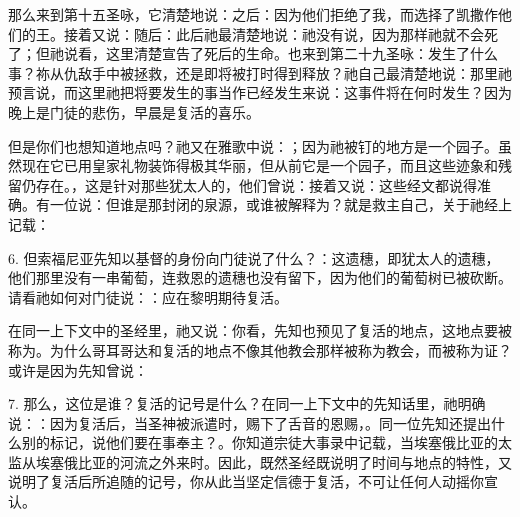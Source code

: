 那么来到第十五圣咏，它清楚地说：之后：因为他们拒绝了我，而选择了凯撒作他们的王。接着又说：随后：此后祂最清楚地说：祂没有说，因为那样祂就不会死了；但祂说看，这里清楚宣告了死后的生命。也来到第二十九圣咏：发生了什么事？祢从仇敌手中被拯救，还是即将被打时得到释放？祂自己最清楚地说：那里祂预言说，而这里祂把将要发生的事当作已经发生来说：这事件将在何时发生？因为晚上是门徒的悲伤，早晨是复活的喜乐。\par

但是你们也想知道地点吗？祂又在雅歌中说：；因为祂被钉的地方是一个园子。虽然现在它已用皇家礼物装饰得极其华丽，但从前它是一个园子，而且这些迹象和残留仍存在。，这是针对那些犹太人的，他们曾说：接着又说：这些经文都说得准确。有一位说：但谁是那封闭的泉源，或谁被解释为？就是救主自己，关于祂经上记载：\par

6. 但索福尼亚先知以基督的身份向门徒说了什么？：这遗穗，即犹太人的遗穗，他们那里没有一串葡萄，连救恩的遗穗也没有留下，因为他们的葡萄树已被砍断。请看祂如何对门徒说：：应在黎明期待复活。\par

在同一上下文中的圣经里，祂又说：你看，先知也预见了复活的地点，这地点要被称为。为什么哥耳哥达和复活的地点不像其他教会那样被称为教会，而被称为证？或许是因为先知曾说：\par

7. 那么，这位是谁？复活的记号是什么？在同一上下文中的先知话里，祂明确说：：因为复活后，当圣神被派遣时，赐下了舌音的恩赐，。同一位先知还提出什么别的标记，说他们要在事奉主？。你知道宗徒大事录中记载，当埃塞俄比亚的太监从埃塞俄比亚的河流之外来时。因此，既然圣经既说明了时间与地点的特性，又说明了复活后所追随的记号，你从此当坚定信德于复活，不可让任何人动摇你宣认。\par

